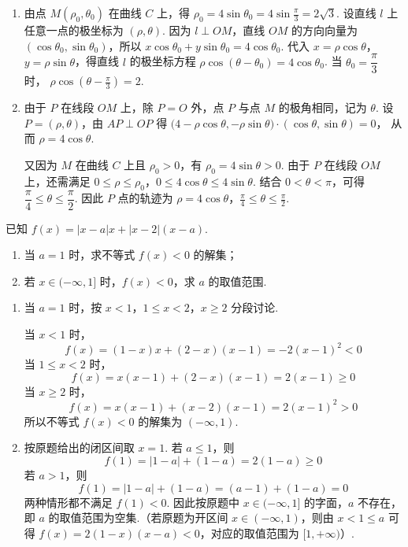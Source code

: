 \begin{solution}
\begin{enumerate}
\item 由点 \(M(\rho_0,\theta_0)\) 在曲线 \(C\) 上，得
\(\rho_0=4\sin\theta_0=4\sin\frac{\pi}{3}=2\sqrt3\).
设直线 \(l\) 上任意一点的极坐标为 \((\rho,\theta)\). 因为 \(l\perp OM\)，直线 \(OM\) 的方向向量为 \((\cos\theta_0,\sin\theta_0)\)，所以
\(x\cos\theta_0+y\sin\theta_0=4\cos\theta_0\).
代入 \(x=\rho\cos\theta\)，\(y=\rho\sin\theta\)，得直线 \(l\) 的极坐标方程
\(\rho\cos(\theta-\theta_0)=4\cos\theta_0\).
当 \(\theta_0=\dfrac{\pi}{3}\) 时，
\(\rho\cos\left(\theta-\frac{\pi}{3}\right)=2\).

\item 由于 \(P\) 在线段 \(OM\) 上，除 \(P=O\) 外，点 \(P\) 与点 \(M\) 的极角相同，记为 \(\theta\). 设 \(P=(\rho,\theta)\)，由 \(AP\perp OP\) 得
\(\bigl(4-\rho\cos\theta,-\rho\sin\theta\bigr)\cdot(\cos\theta,\sin\theta)=0\)，
从而 \(\rho=4\cos\theta\).

又因为 \(M\) 在曲线 \(C\) 上且 \(\rho_0>0\)，有 \(\rho_0=4\sin\theta>0\). 由于 \(P\) 在线段 \(OM\) 上，还需满足
\(0\le\rho\le\rho_0\)，\(0\le4\cos\theta\le4\sin\theta\).
结合 \(0<\theta<\pi\)，可得 \(\dfrac{\pi}{4}\le\theta\le\dfrac{\pi}{2}\). 因此 \(P\) 点的轨迹为
\(\rho=4\cos\theta\)，\(\frac{\pi}{4}\le\theta\le\frac{\pi}{2}\).
\end{enumerate}
\end{solution}

\begin{problem}
已知 \(f(x)=|x-a|x+|x-2|(x-a)\).

\begin{enumerate}
\item 当 \(a=1\) 时，求不等式 \(f(x)<0\) 的解集；
\item 若 \(x\in(-\infty,1]\) 时，\(f(x)<0\)，求 \(a\) 的取值范围.
\end{enumerate}
\end{problem}

\begin{solution}
\begin{enumerate}
\item 当 \(a=1\) 时，按 \(x<1\)，\(1\le x<2\)，\(x\ge2\) 分段讨论.

当 \(x<1\) 时，
\[
f(x)=(1-x)x+(2-x)(x-1)=-2(x-1)^2<0
\]
当 \(1\le x<2\) 时，
\[
f(x)=x(x-1)+(2-x)(x-1)=2(x-1)\ge0
\]
当 \(x\ge2\) 时，
\[
f(x)=x(x-1)+(x-2)(x-1)=2(x-1)^2>0
\]
所以不等式 \(f(x)<0\) 的解集为 \((-\infty,1)\).

\item 按原题给出的闭区间取 \(x=1\). 若 \(a\le1\)，则
\[
f(1)=|1-a|+(1-a)=2(1-a)\ge0
\]
若 \(a>1\)，则
\[
f(1)=|1-a|+(1-a)=(a-1)+(1-a)=0
\]
两种情形都不满足 \(f(1)<0\). 因此按原题中 \(x\in(-\infty,1]\) 的字面，\(a\) 不存在，即 \(a\) 的取值范围为空集.（若原题为开区间 \(x\in(-\infty,1)\)，则由 \(x<1\le a\) 可得 \(f(x)=2(1-x)(x-a)<0\)，对应的取值范围为 \([1,+\infty)\)）.
\end{enumerate}
\end{solution}
